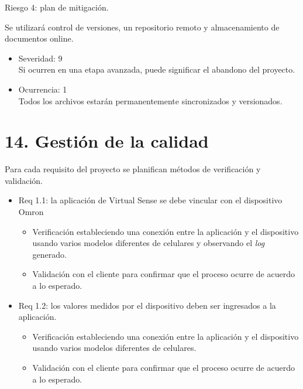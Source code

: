 \documentclass[
11pt, %
]{charter}
\begin{document}
Riesgo 4: plan de mitigación.

Se utilizará control de versiones, un repositorio remoto y almacenamiento de documentos online.
  \begin{itemize}
	\item Severidad: 9\\
		Si ocurren en una etapa avanzada, puede significar el abandono del proyecto.
	\item Ocurrencia: 1 \\
		Todos los archivos estarán permanentemente sincronizados y versionados.
	\end{itemize}
	

\section{14. Gestión de la calidad}
\label{sec:calidad}

Para cada requisito del proyecto se planifican métodos de verificación y validación.

\begin{itemize}
\item Req 1.1: la aplicación de Virtual Sense se debe vincular con el dispositivo Omron

\begin{itemize}
	\item Verificación estableciendo una conexión entre la aplicación y el dispositivo usando varios modelos diferentes de celulares y observando el \textit{log} generado.
	\item Validación con el cliente para confirmar que el proceso ocurre de acuerdo a lo esperado.
\end{itemize}

\end{itemize}

\begin{itemize}
\item Req 1.2: los valores medidos por el dispositivo deben ser ingresados a la aplicación.

\begin{itemize}
	\item Verificación estableciendo una conexión entre la aplicación y el dispositivo usando varios modelos diferentes de celulares.
	\item Validación con el cliente para confirmar que el proceso ocurre de acuerdo a lo esperado.
\end{itemize}

\end{itemize}
\end{document}
